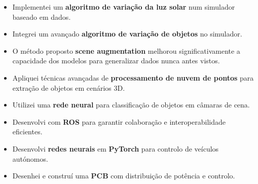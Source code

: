 \documentclass[10pt,a4paper]{altacv}
\begin{document}

\begin{itemize}
\item Implementei um \textbf{algoritmo de variação da luz solar} num simulador baseado em dados.  
\item Integrei um avançado \textbf{algoritmo de variação de objetos} no simulador.  
\item O método proposto \textbf{scene augmentation} melhorou significativamente a capacidade dos modelos para generalizar dados nunca antes vistos.  
\end{itemize}

\medskip

\begin{itemize}
\item Apliquei técnicas avançadas de \textbf{processamento de nuvem de pontos} para extração de objetos em cenários 3D.  
\item Utilizei uma \textbf{rede neural} para classificação de objetos em câmaras de cena.  
\item Desenvolvi com \textbf{ROS} para garantir colaboração e interoperabilidade eficientes.  
\end{itemize}

\medskip

\begin{itemize}
\item Desenvolvi \textbf{redes neurais} em \textbf{PyTorch} para controlo de veículos autónomos.  
\item Desenhei e construí uma \textbf{PCB} com distribuição de potência e controlo.  
\end{itemize}



\clearpage




\end{document}
